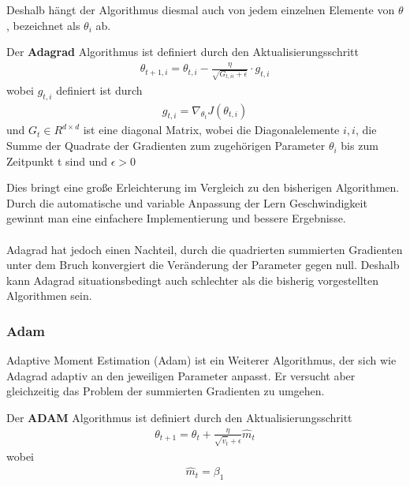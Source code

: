 Deshalb hängt der Algorithmus diesmal auch von jedem einzelnen Elemente von $\theta$,
 bezeichnet als $\theta_i$ ab.
 
\begin{definition}
    \cite[Kapitel 4.3]{Ruder.9152016}
    Der \textbf{Adagrad} Algorithmus ist definiert durch den Aktualisierungsschritt
    \begin{align}
        \theta_{t+1,i} = \theta_{t,i} - \frac{\eta}{\sqrt{G_{t,ii}+\epsilon}} \cdot g_{t,i}
    \end{align}
    wobei $g_{t,i}$ definiert ist durch
    \begin{align}
        g_{t,i} = \nabla_{\theta_t} J(\theta_{t,i})
    \end{align}
    und $G_t \in R^{d\times d}$ ist eine diagonal Matrix, wobei die Diagonalelemente $i,i$, die 
    Summe der Quadrate der Gradienten zum zugehörigen Parameter $\theta_i$ bis zum Zeitpunkt
    t sind und $\epsilon > 0$ 
    
\end{definition}

Dies bringt eine große Erleichterung im Vergleich zu den bisherigen Algorithmen.
Durch die automatische und variable Anpassung der Lern Geschwindigkeit gewinnt man 
eine einfachere Implementierung und bessere Ergebnisse. 
\\\\
Adagrad hat jedoch einen Nachteil, durch die quadrierten summierten Gradienten
unter dem Bruch konvergiert die Veränderung der Parameter gegen null.
Deshalb kann Adagrad situationsbedingt auch schlechter als 
die bisherig vorgestellten Algorithmen sein. 

\subsubsection{Adam}\label{Adam}
\cite{DiederikP.KingmaandJimmyLeiBa.2015}
Adaptive Moment Estimation (Adam) ist ein Weiterer Algorithmus, 
der sich wie Adagrad adaptiv an den jeweiligen Parameter anpasst.
Er versucht aber gleichzeitig das Problem der summierten Gradienten 
zu umgehen. 

\begin{definition}
    Der \textbf{ADAM} Algorithmus ist definiert durch
    den Aktualisierungsschritt
    \begin{align}
        \theta_{t+1} = \theta_t +\frac{\eta}{\sqrt{\hat{v}_t}+\epsilon}\hat{m}_t
    \end{align}
    wobei 
    \begin{align}
        \hat{m}_t = \beta_1
    \end{align}
\end{definition}
